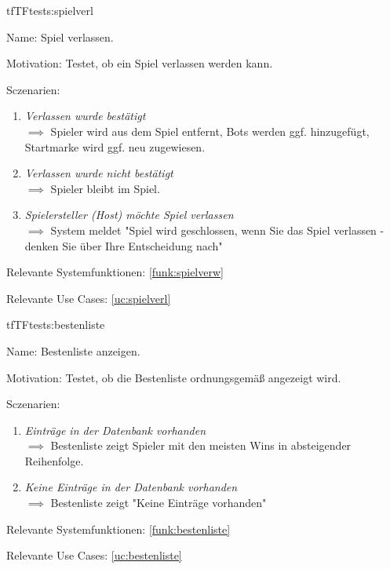 \begin{description}[leftmargin=5em, style=sameline]
\begin{lhp}{tf}{TF}{tests:spielverl}
	\item [Name:] Spiel verlassen.
	\item [Motivation:] Testet, ob ein Spiel verlassen werden kann.
	\item [Sczenarien:] \hfill
	\begin{enumerate}
		\item \textit{Verlassen wurde bestätigt} \\ $\implies$ Spieler wird aus dem Spiel entfernt, Bots werden ggf. hinzugefügt, Startmarke wird ggf. neu zugewiesen.
		\item \textit{Verlassen wurde nicht bestätigt} \\ $\implies$ Spieler bleibt im Spiel.
		\item \textit{Spielersteller (Host) möchte Spiel verlassen} \\ $\implies$ System meldet "{}Spiel wird geschlossen, wenn Sie das Spiel verlassen - denken Sie über Ihre Entscheidung nach"{}
	\end{enumerate}
	\item [Relevante Systemfunktionen:] \ref{funk:spielverw}
	\item [Relevante Use Cases:] \ref{uc:spielverl}
\end{lhp}

\begin{lhp}{tf}{TF}{tests:bestenliste}
	\item [Name:] Bestenliste anzeigen.
	\item [Motivation:] Testet, ob die Bestenliste ordnungsgemäß angezeigt wird.
	\item [Sczenarien:] \hfill
	\begin{enumerate}
		\item \textit{Einträge in der Datenbank vorhanden} \\ $\implies$ Bestenliste zeigt Spieler mit den meisten Wins in absteigender Reihenfolge.
		\item \textit{Keine Einträge in der Datenbank vorhanden} \\ $\implies$ Bestenliste zeigt "{}Keine Einträge vorhanden"{}
	\end{enumerate}
	\item [Relevante Systemfunktionen:] \ref{funk:bestenliste}
	\item [Relevante Use Cases:] \ref{uc:bestenliste}
\end{lhp}


\end{description}
